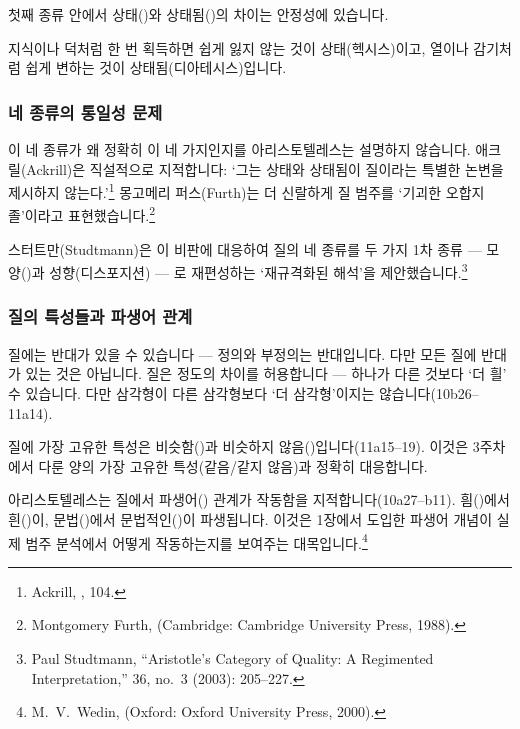 \documentclass[12pt, a4paper]{article}
\begin{document}
첫째 종류 안에서 상태()와 상태됨()의 차이는 안정성에 있습니다.


지식이나 덕처럼 한 번 획득하면 쉽게 잃지 않는 것이 상태(헥시스)이고, 열이나 감기처럼 쉽게 변하는 것이 상태됨(디아테시스)입니다.

\subsubsection{네 종류의 통일성 문제}

이 네 종류가 왜 정확히 이 네 가지인지를 아리스토텔레스는 설명하지 않습니다. 애크릴(Ackrill)은 직설적으로 지적합니다: `그는 상태와 상태됨이 질이라는 특별한 논변을 제시하지 않는다.'\footnote{Ackrill, , 104.} 몽고메리 퍼스(Furth)는 더 신랄하게 질 범주를 `기괴한 오합지졸'이라고 표현했습니다.\footnote{Montgomery Furth,  (Cambridge: Cambridge University Press, 1988).}

스터트만(Studtmann)은 이 비판에 대응하여 질의 네 종류를 두 가지 1차 종류 --- 모양()과 성향(디스포지션) --- 로 재편성하는 `재규격화된 해석'을 제안했습니다.\footnote{Paul Studtmann, ``Aristotle's Category of Quality: A Regimented Interpretation,''  36, no.\ 3 (2003): 205--227.}

\subsubsection{질의 특성들과 파생어 관계}

질에는 반대가 있을 수 있습니다 --- 정의와 부정의는 반대입니다. 다만 모든 질에 반대가 있는 것은 아닙니다. 질은 정도의 차이를 허용합니다 --- 하나가 다른 것보다 `더 흴' 수 있습니다. 다만 삼각형이 다른 삼각형보다 `더 삼각형'이지는 않습니다(10b26--11a14).

질에 가장 고유한 특성은 비슷함()과 비슷하지 않음()입니다(11a15--19). 이것은 3주차에서 다룬 양의 가장 고유한 특성(같음/같지 않음)과 정확히 대응합니다.

아리스토텔레스는 질에서 파생어() 관계가 작동함을 지적합니다(10a27--b11). 흼()에서 흰()이, 문법()에서 문법적인()이 파생됩니다. 이것은 1장에서 도입한 파생어 개념이 실제 범주 분석에서 어떻게 작동하는지를 보여주는 대목입니다.\footnote{M.\ V.\ Wedin,  (Oxford: Oxford University Press, 2000).}
\end{document}
